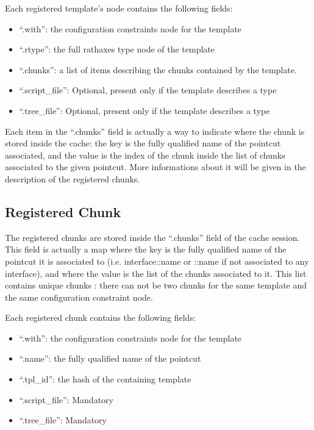 \documentclass[american]{rtxreport}
\begin{document}
Each registered template's node contains the following fields:
\begin{itemize}
    \item ``.with'': the configuration constraints node for the template
    \item ``.rtype'': the full rathaxes type node of the template
    \item ``.chunks'': a list of items describing the chunks contained by the
            template.
    \item ``.script\_file'': Optional, present only if the template describes
            a type
    \item ``.tree\_file'': Optional, present only if the template describes
            a type
\end{itemize}

Each item in the ``.chunks'' field is actually a way to indicate where the
chunk is stored inside the cache: the key is the fully qualified name of the
pointcut associated, and the value is the index of the chunk inside the list of
chunks associated to the given pointcut. More informations about it will be
given in the description of the registered chunks.


\subsection{Registered Chunk}

The registered chunks are stored inside the ``.chunks'' field of the cache
session. This field is actually a map where the key is the fully qualified name
of the pointcut it is associated to (i.e. interface::name or ::name if not
associated to any interface), and where the value is the list of the chunks
associated to it. This list contains unique chunks : there can not be two
chunks for the same template and the same configuration constraint node.

Each registered chunk contains the following fields:
\begin{itemize}
    \item ``.with'': the configuration constraints node for the template
    \item ``.name'': the fully qualified name of the pointcut
    \item ``.tpl\_id'': the hash of the containing template
    \item ``.script\_file'': Mandatory
    \item ``.tree\_file'': Mandatory
\end{itemize}
\end{document}
